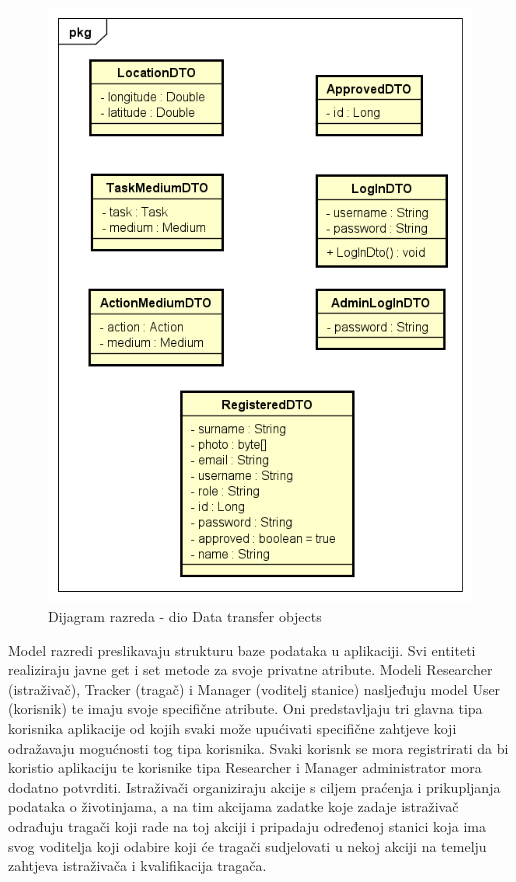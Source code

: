 		\begin{figure}[H] %
			\centering
			\includegraphics[width=\textwidth]{slike/dtodiagram.png}
			\caption{Dijagram razreda - dio Data transfer objects}
			\label{fig:DTOdiagram}
		\end{figure}
		
		\eject
		
		
		Model razredi preslikavaju strukturu baze podataka u aplikaciji. Svi entiteti realiziraju javne get i set metode za svoje privatne atribute. Modeli Researcher (istraživač), Tracker (tragač) i Manager (voditelj stanice) nasljeđuju model User (korisnik) te imaju svoje specifične atribute. Oni predstavljaju tri glavna tipa korisnika aplikacije od kojih svaki može upućivati specifične zahtjeve koji odražavaju mogućnosti tog tipa korisnika. Svaki korisnk se mora registrirati da bi koristio aplikaciju te korisnike tipa Researcher i Manager  administrator mora dodatno potvrditi. Istraživači organiziraju akcije s ciljem praćenja i prikupljanja podataka o životinjama, a na tim akcijama zadatke koje zadaje istraživač odrađuju tragači koji rade na toj akciji i pripadaju određenoj stanici koja ima svog voditelja koji odabire koji će tragači sudjelovati u nekoj akciji na temelju zahtjeva istraživača i kvalifikacija tragača. 
		
